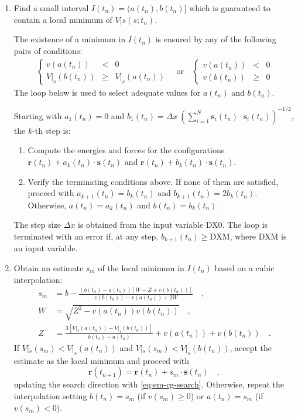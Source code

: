 \documentclass[10pt,a4paper]{report}
\numberwithin{equation}{section}
\newcommand{\ssub}[1]{\mathbf{s}_{#1}}
\begin{document}
\begin{enumerate}
\item Find a small interval $I(t_n)=(a(t_n), b(t_n)]$ which is guaranteed to contain a local minimum of $V|s(s;t_n)$.
  \par
  The existence of a minimum in $I(t_n)$ is ensured by any of the following pairs of conditions:
  \begin{align*}
    \left\{
    \begin{array}{rcl}
      v(a(t_n)) & < &0 \\
     V|_s(b(t_n)) & \geq &V|_s(a(t_n))
      \end{array}\right.
               \quad\text{or}\quad
      \left\{
      \begin{array}{rcl}
        v(a(t_n)) & < & 0 \\
        v(b(t_n)) & \geq & 0
      \end{array}\right.
  \end{align*}
  The loop below is used to select adequate values for $a(t_n)$ and $b(t_n)$.
  
  Starting with $a_1(t_n) = 0$ and $b_1(t_n) = \Delta x\ (\sum_{i=1}^N \ssub{i}(t_n)\cdot\ssub{i}(t_n))^{-1/2}$, the $k$-th step is:
  \begin{enumerate}
  \item Compute the energies and forces for the configurations $\mathbf{r}(t_n) + a_k(t_n)\cdot\mathbf{s}(t_n)$ and $\mathbf{r}(t_n) + b_k(t_n)\cdot\mathbf{s}(t_n)$.
  \item Verify the terminating conditions above. If none of them are satisfied, proceed with $a_{k+1}(t_n) = b_{k}(t_n)$ and $b_{k+1}(t_n)=2b_k(t_n)$.
    Otherwise, $a(t_n) = a_k(t_n)$ and $b(t_n) = b_k(t_n)$.
  \end{enumerate}
  The step size $\Delta x$ is obtained from the input variable DX0.
  The loop is terminated with an error if, at any step, $b_{k+1}(t_n) \geq \text{DXM}$, where DXM is an input variable.
\item Obtain an estimate $s_{m}$ of the local minimum in $I(t_n)$ based on a cubic interpolation:
  \begin{align}
    \label{eq:em-cg-interp}
    s_m & = b - \frac{(b(t_n) - a(t_n))[W-Z+v(b(t_n))]}{v(b(t_n)) - v(a(t_n)) + 2W} \quad ,\\ \nonumber
    W & = \sqrt{Z^2-v(a(t_n))v(b(t_n))} \quad , \\ \nonumber
    Z & = \frac{3[V|_s(a(t_n)) - V|_s(b(t_n))]}{b(t_n) - a(t_n)} + v(a(t_n)) + v(b(t_n)) \quad .
  \end{align}
  If $V|_s(s_{m}) < V|_s(a(t_n))$ and $V|_s(s_{m}) < V|_s(b(t_n))$, accept the estimate as the local minimum and proceed with
  \begin{equation}
    \label{eq:em-cg-step}
    \mathbf{r}(t_{n+1}) = \mathbf{r}(t_n) + s_m \cdot \mathbf{s}(t_n) \quad ,
  \end{equation}
  updating the search direction with \autoref{eq:em-cg-search}.
  Otherwise, repeat the interpolation setting $b(t_n) = s_m$ (if $v(s_m) \geq 0$) or $a(t_n) = s_m$ (if $v(s_m) <0$).

\end{enumerate}
\end{document}
